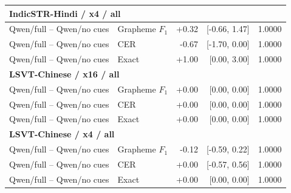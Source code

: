 \begin{longtable}{llrrr}
\midrule
\multicolumn{5}{l}{\textbf{IndicSTR-Hindi / x4 / all}}\\
\midrule
Qwen/full -- Qwen/no cues & Grapheme $F_1$ & +0.32 & [-0.66, 1.47] & 1.0000 \\
Qwen/full -- Qwen/no cues & CER & -0.67 & [-1.70, 0.00] & 1.0000 \\
Qwen/full -- Qwen/no cues & Exact & +1.00 & [0.00, 3.00] & 1.0000 \\
\midrule
\multicolumn{5}{l}{\textbf{LSVT-Chinese / x16 / all}}\\
\midrule
Qwen/full -- Qwen/no cues & Grapheme $F_1$ & +0.00 & [0.00, 0.00] & 1.0000 \\
Qwen/full -- Qwen/no cues & CER & +0.00 & [0.00, 0.00] & 1.0000 \\
Qwen/full -- Qwen/no cues & Exact & +0.00 & [0.00, 0.00] & 1.0000 \\
\midrule
\multicolumn{5}{l}{\textbf{LSVT-Chinese / x4 / all}}\\
\midrule
Qwen/full -- Qwen/no cues & Grapheme $F_1$ & -0.12 & [-0.59, 0.22] & 1.0000 \\
Qwen/full -- Qwen/no cues & CER & +0.00 & [-0.57, 0.56] & 1.0000 \\
Qwen/full -- Qwen/no cues & Exact & +0.00 & [0.00, 0.00] & 1.0000 \\
\midrule
\end{longtable}
\endgroup
